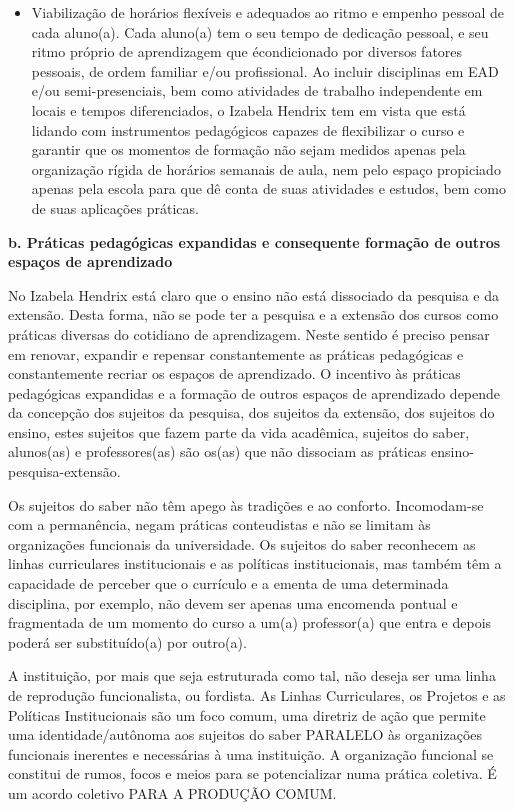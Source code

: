 \documentclass[a4paper, 12pt, openright, oneside, german, french, english, brazil]{abntex2}
\begin{document}
\begin{itemize}
\item Viabilização de horários flexíveis e adequados ao ritmo e empenho pessoal de cada aluno(a). Cada aluno(a) tem o seu tempo de dedicação pessoal, e seu ritmo próprio de aprendizagem que écondicionado por diversos fatores pessoais, de ordem familiar e/ou profissional. Ao incluir disciplinas em EAD e/ou semi-presenciais, bem como atividades de trabalho independente em locais e tempos diferenciados, o Izabela Hendrix tem em vista que está lidando com instrumentos pedagógicos capazes de flexibilizar o curso e garantir que os momentos de formação não sejam medidos apenas pela organização rígida de horários semanais de aula, nem pelo espaço propiciado apenas pela escola para que dê conta de suas atividades e estudos, bem como de suas aplicações práticas.
\end{itemize}

\textbf{b. Práticas pedagógicas expandidas e consequente formação de outros espaços de aprendizado}

No Izabela Hendrix está claro que o ensino não está dissociado da pesquisa e da extensão. Desta forma, não se pode ter a pesquisa e a extensão dos cursos como práticas diversas do cotidiano de aprendizagem. Neste sentido é preciso pensar em renovar, expandir e repensar constantemente as práticas pedagógicas e constantemente recriar os espaços de aprendizado. O incentivo às práticas pedagógicas expandidas e a formação de outros espaços de aprendizado depende da concepção dos sujeitos da pesquisa, dos sujeitos da extensão, dos sujeitos do ensino, estes sujeitos que fazem parte da vida acadêmica, sujeitos do saber, alunos(as) e professores(as) são os(as) que não dissociam as práticas ensino-pesquisa-extensão.

Os sujeitos do saber não têm apego às tradições e ao conforto. Incomodam-se com a permanência, negam práticas conteudistas e não se limitam às organizações funcionais da universidade. Os sujeitos do saber reconhecem as linhas curriculares institucionais e as políticas institucionais, mas também têm a capacidade de perceber que o currículo e a ementa de uma determinada disciplina, por exemplo, não devem ser apenas uma encomenda pontual e fragmentada de um momento do curso a um(a) professor(a) que entra e depois poderá ser substituído(a) por outro(a).

A instituição, por mais que seja estruturada como tal, não deseja ser uma linha de reprodução funcionalista, ou fordista. As Linhas Curriculares, os Projetos e as Políticas Institucionais são um foco comum, uma diretriz de ação que permite uma identidade/autônoma aos sujeitos do saber PARALELO às organizações funcionais inerentes e necessárias à uma instituição. A organização funcional se constitui de rumos, focos e meios para se potencializar numa prática coletiva. É um acordo coletivo PARA A PRODUÇÃO COMUM.
\end{document}
